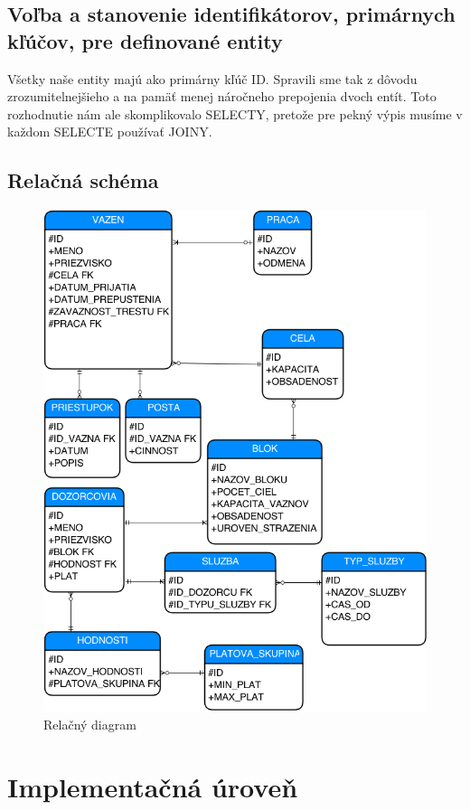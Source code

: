 \documentclass[slovak, 12pt, Times New Roman]{article}
\begin{document}
		\subsection{Voľba a stanovenie identifikátorov, primárnych kľúčov, pre definované entity}
			Všetky naše entity majú ako primárny kľúč ID. Spravili sme tak z dôvodu zrozumitelnejšieho a na pamäť menej náročneho prepojenia dvoch entít. Toto rozhodnutie nám ale skomplikovalo SELECTY, pretože pre pekný výpis musíme v každom SELECTE používať JOINY.
		\clearpage
		\subsection{Relačná schéma}	
			\begin{figure}[!htb]
				\centering
				\includegraphics[scale=0.6]{relacnyDia.png}
				\caption{Relačný diagram}
				\label{fig:Reinforcement}
			\end{figure}
	\section{Implementačná úroveň}
\end{document}
